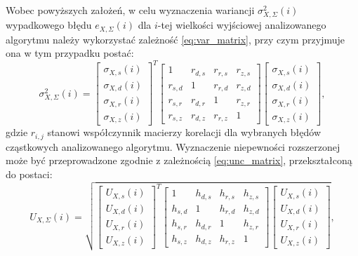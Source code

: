 Wobec powyższych założeń, w celu wyznaczenia wariancji $\sigma_{X,\Sigma}^{2}(i)$ wypadkowego błędu $e_{X,\Sigma}(i)$ dla $i$-tej wielkości wyjściowej analizowanego algorytmu należy wykorzystać zależność \eqref{eq:var_matrix}, przy czym przyjmuje ona w tym przypadku postać:
\begin{equation}
\sigma_{X,\Sigma}^{2} \left( i \right) =
\begin{bmatrix}
\sigma_{X,s} \left( i \right) \\ \sigma_{X,d} \left( i \right) \\ \sigma_{X,r} \left( i \right) \\ \sigma_{X,z} \left( i \right)
\end{bmatrix}^{T}
\begin{bmatrix}
1         & r_{d,s} & r_{r,s} & r_{z,s} \\
r_{s,d}   & 1       & r_{r,d} & r_{z,d} \\
r_{s,r}   & r_{d,r} & 1       & r_{z,r} \\
r_{s,z}   & r_{d,z} & r_{r,z} & 1
\end{bmatrix}
\begin{bmatrix}
\sigma_{X,s} \left( i \right) \\ \sigma_{X,d} \left( i \right) \\ \sigma_{X,r} \left( i \right) \\ \sigma_{X,z} \left( i \right)
\end{bmatrix}
\label{eq:alg_outvar_mat},
\end{equation}
gdzie $r_{i,j}$ stanowi współczynnik macierzy korelacji dla wybranych błędów cząstkowych analizowanego algorytmu. Wyznaczenie niepewności rozszerzonej może być przeprowadzone zgodnie z zależnością \eqref{eq:unc_matrix}, przekształconą do postaci:
\begin{equation}
U_{X,\Sigma} \left( i \right) = \sqrt{
\begin{bmatrix}
U_{X,s} \left( i \right) \\ U_{X,d} \left( i \right) \\ U_{X,r} \left( i \right) \\ U_{X,z} \left( i \right)
\end{bmatrix}^{T}
\begin{bmatrix}
1         & h_{d,s} & h_{r,s} & h_{z,s} \\
h_{s,d}   & 1       & h_{r,d} & h_{z,d} \\
h_{s,r}   & h_{d,r} & 1       & h_{z,r} \\
h_{s,z}   & h_{d,z} & h_{r,z} & 1
\end{bmatrix}
\begin{bmatrix}
U_{X,s} \left( i \right) \\ U_{X,d} \left( i \right) \\ U_{X,r} \left( i \right) \\ U_{X,z} \left( i \right)
\end{bmatrix}}
\label{eq:alg_outunc_mat},
\end{equation}

